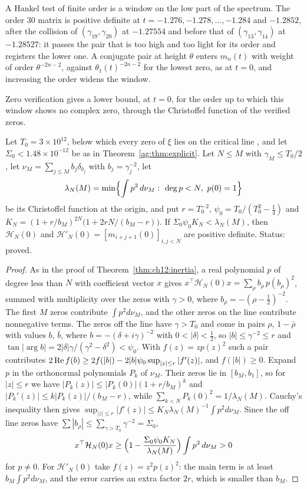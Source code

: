 A Hankel test of finite order is a window on the low part of the spectrum. The order $30$ matrix is positive definite at $t=-1.276,-1.278,\dots,-1.284$ and $-1.2852$, after the collision of $(\gamma_{19},\gamma_{20})$ at $-1.27554$ and before that of $(\gamma_{13},\gamma_{14})$ at $-1.28527$: it passes the pair that is too high and too light for its order and registers the lower one. A conjugate pair at height $\theta$ enters $m_n(t)$ with weight of order $\theta^{-2n-2}$, against $\theta_1(t)^{-2n-2}$ for the lowest zero, as at $t=0$, and increasing the order widens the window.

Zero verification gives a lower bound, at $t=0$, for the order up to which this window shows no complex zero, through the Christoffel function of the verified zeros.

\begin{proposition}\label{prop:ch21:verhankel}
Let $T_0=3\times10^{12}$, below which every zero of $\xi$ lies on the critical line \cite{PT21}, and let $\Sigma_0<1.48\times10^{-12}$ be as in Theorem~\ref{ag:thm:explicit}. Let $N\le M$ with $\gamma_M\le T_0/2$, let $\nu_M=\sum_{j\le M}b_j\delta_{b_j}$ with $b_j=\gamma_j^{-2}$, let
\[
\lambda_N(M)=\min\Bigl\{\int p^2\,d\nu_M:\ \deg p<N,\ p(0)=1\Bigr\}
\]
be its Christoffel function at the origin, and put $r=T_0^{-2}$, $\psi_0=T_0/(T_0^2-\frac14)$ and $K_N=(1+r/b_M)^{2N}\bigl(1+2rN/(b_M-r)\bigr)$. If $\Sigma_0\psi_0K_N<\lambda_N(M)$, then $\mathcal H_N(0)$ and $\mathcal H'_N(0)=[m_{i+j+1}(0)]_{i,j<N}$ are positive definite. Status: proved.
\end{proposition}

\begin{proof}
As in the proof of Theorem~\ref{thm:ch12:inertia}, a real polynomial $p$ of degree less than $N$ with coefficient vector $x$ gives $x^\top\mathcal H_N(0)x=\sum_\rho b_\rho\,p(b_\rho)^2$, summed with multiplicity over the zeros with $\gamma>0$, where $b_\rho=-(\rho-\frac12)^{-2}$. The first $M$ zeros contribute $\int p^2d\nu_M$, and the other zeros on the line contribute nonnegative terms. The zeros off the line have $\gamma>T_0$ and come in pairs $\rho$, $1-\bar\rho$ with values $b$, $\bar b$, where $b=-(\delta+i\gamma)^{-2}$ with $0<|\delta|<\frac12$, so $|b|\le\gamma^{-2}\le r$ and $\tan|\arg b|=2|\delta|\gamma/(\gamma^2-\delta^2)<\psi_0$. With $f(z)=zp(z)^2$ such a pair contributes $2\operatorname{Re} f(b)\ge2f(|b|)-2|b|\psi_0\sup_{|z|\le r}|f'(z)|$, and $f(|b|)\ge0$. Expand $p$ in the orthonormal polynomials $P_k$ of $\nu_M$. Their zeros lie in $[b_M,b_1]$, so for $|z|\le r$ we have $|P_k(z)|\le|P_k(0)|(1+r/b_M)^k$ and $|P_k'(z)|\le k|P_k(z)|/(b_M-r)$, while $\sum_{k<N}P_k(0)^2=1/\lambda_N(M)$. Cauchy's inequality then gives $\sup_{|z|\le r}|f'(z)|\le K_N\lambda_N(M)^{-1}\int p^2d\nu_M$. Since the off line zeros have $\sum|b_\rho|\le\sum_{\gamma>T_0}\gamma^{-2}=\Sigma_0$,
\[
x^\top\mathcal H_N(0)x\ge\Bigl(1-\frac{\Sigma_0\psi_0K_N}{\lambda_N(M)}\Bigr)\int p^2\,d\nu_M>0
\]
for $p\ne0$. For $\mathcal H'_N(0)$ take $f(z)=z^2p(z)^2$: the main term is at least $b_M\int p^2d\nu_M$, and the error carries an extra factor $2r$, which is smaller than $b_M$.
\end{proof}


